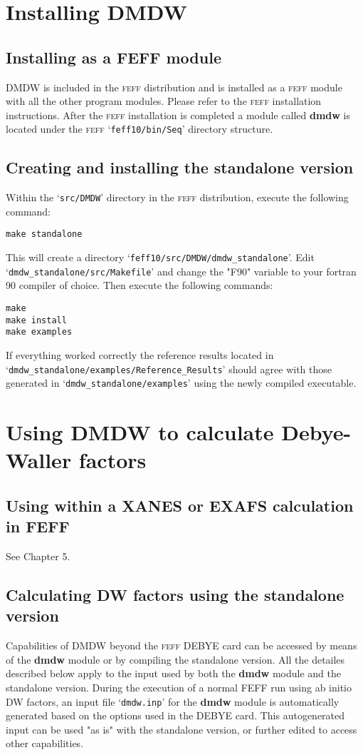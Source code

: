 \documentclass[11pt,oneside]{report} %
\renewcommand{\htmlref}[2]{\hyperlink{#2}{#1}}
\newcommand{\program}[1]{\textsc{#1}}
\newcommand{\feff}{\program{feff}}
\newcommand{\file}[1]{`\texttt{#1}'}
\newcommand{\module}[1]{\textrm{\bf{#1}}}
\renewcommand{\htmlref}[2]{{#1}} %
\begin{document}
\begin{latexonly}
\section{Installing DMDW}
\label{sec:Append-G-DMDW-Install}
\subsection{Installing as a FEFF module}
DMDW is included in the {\feff} distribution and is installed as a {\feff} module with all the other program modules.
Please refer to the {\feff} installation instructions. After the {\feff} installation is completed a
module called \module{dmdw} is located under the {\feff} \file{feff10/bin/Seq} directory structure.

\subsection{Creating and installing the standalone version}
Within the \file{src/DMDW} directory in the {\feff} distribution, execute the following
command:
\begin{verbatim}
make standalone
\end{verbatim}
This will create a directory \file{feff10/src/DMDW/dmdw\_standalone}. Edit \file{dmdw\_standalone/src/Makefile}
and change the "F90" variable to your fortran 90 compiler of choice. Then execute the following commands:
\begin{verbatim}
make
make install
make examples
\end{verbatim}
If everything worked correctly the reference results located in
\file{dmdw\_standalone/examples/Reference\_Results} should agree with those generated
in \file{dmdw\_standalone/examples} using the newly compiled executable.

\section{Using DMDW to calculate Debye-Waller factors}
\label{sec:Append-G-DMDW-Use}
\subsection{Using within a XANES or EXAFS calculation in FEFF}
See \htmlref{Chapter 5}{sec:DWfactors}.

\subsection{Calculating DW factors using the standalone version}
Capabilities of DMDW beyond the {\feff} DEBYE card can be accessed by means of the \module{dmdw} module or by
compiling the standalone version. All the detailes described below apply to
the input used by both the \module{dmdw} module and the standalone version. During the
execution of a normal FEFF run using ab initio DW factors, an input file \file{dmdw.inp} for the
\module{dmdw} module is automatically generated based on the options used in the DEBYE
card. This autogenerated input can be used "as is" with the standalone version,
or further edited to access other capabilities.


\end{latexonly}
\end{document}
